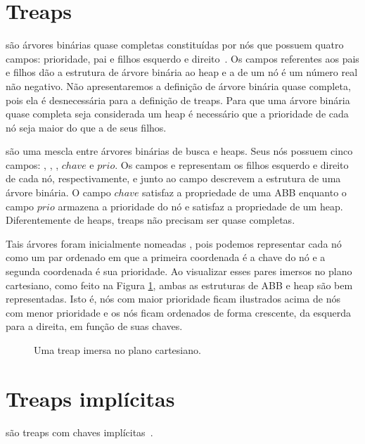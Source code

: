 \section{Treaps}

 são árvores binárias quase completas constituídas por nós que possuem quatro campos: prioridade, pai e filhos esquerdo e direito~\cite{CLRS}.
Os campos referentes aos pais e filhos dão a estrutura de árvore binária ao heap e a  de um nó é um número real não negativo.
Não apresentaremos a definição de árvore binária quase completa, pois ela é desnecessária para a definição de treaps. Para que uma árvore binária quase completa seja considerada um heap é necessário que a prioridade de cada nó seja maior do que a de seus filhos.

 são uma mescla entre árvores binárias de busca e heaps. Seus nós possuem cinco campos: , , , $chave$ e $prio$. Os campos  e  representam os filhos esquerdo e direito de cada nó, respectivamente, e junto ao campo  descrevem a estrutura de uma árvore binária. O campo $chave$ satisfaz a propriedade de uma ABB enquanto o campo $prio$ armazena a prioridade do nó e satisfaz a propriedade de um heap. Diferentemente de heaps, treaps não precisam ser quase completas.


Tais árvores foram inicialmente nomeadas  \cite{Vuillemin1980AUL}, pois podemos representar cada nó como um par ordenado em que a primeira coordenada é a chave do nó e a segunda coordenada é sua prioridade. Ao visualizar esses pares imersos no plano cartesiano, como feito na Figura \ref{fig:TREAP}, ambas as estruturas de ABB e heap são bem representadas. Isto é, nós com maior prioridade ficam ilustrados acima de nós com menor prioridade e os nós ficam ordenados de forma crescente, da esquerda para a direita, em função de suas chaves.

\begin{figure}[htb]
\centering

\caption{Uma treap imersa no plano cartesiano.}
\label{fig:TREAP}
\end{figure}

\section{Treaps implícitas}
\label{sec:imple-treap}

 são treaps com chaves implícitas~\cite{treap}.

